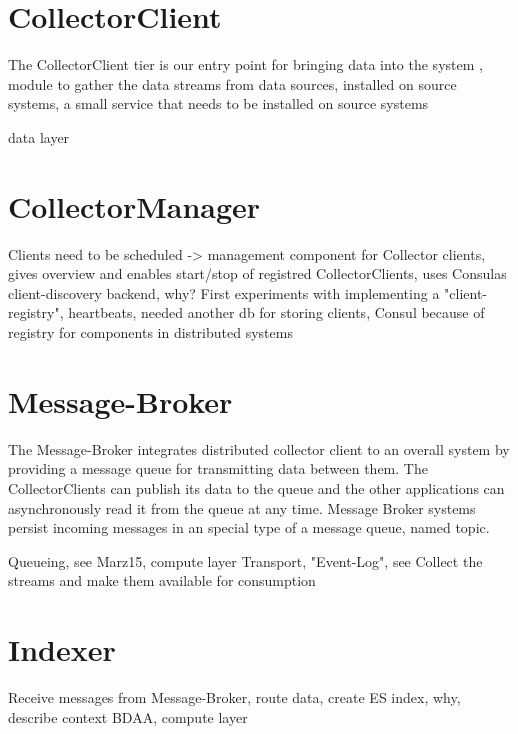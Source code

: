 \section{CollectorClient}

The CollectorClient tier is our entry point for bringing data into the system , module to gather the data streams
from data sources, installed on source systems, a small service that needs to be installed on source systems

data layer

\section{CollectorManager}

Clients need to be scheduled -> management component for Collector clients, gives overview and enables start/stop of
registred CollectorClients, uses Consulas client-discovery backend, why? First experiments with implementing a "client-registry",
heartbeats, needed another db for storing clients, Consul because of registry for components in distributed systems

%
\section{Message-Broker}

The Message-Broker integrates distributed collector client to an overall system by providing a
message queue for transmitting data  between them. The CollectorClients can publish
its data to the queue and the other applications can asynchronously read it from the queue at any time.
Message Broker systems persist incoming messages in an special type of a message queue, named topic.

Queueing, see Marz15, compute layer
Transport, "Event-Log", see \cite{Kreps13}
Collect the streams and make them available for consumption

\section{Indexer}

Receive messages from Message-Broker, route data, create ES index, why, describe context BDAA, compute layer

